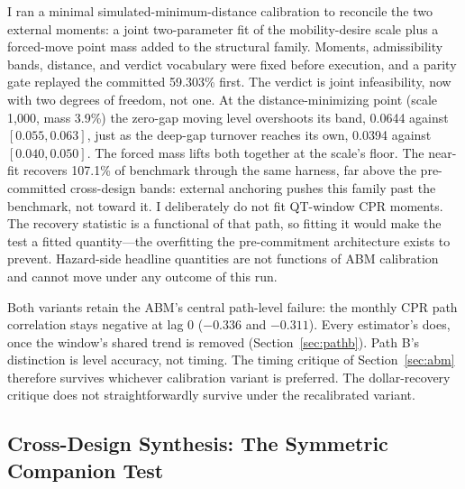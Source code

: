 \documentclass[12pt]{article}
\begin{document}
I ran a minimal simulated-minimum-distance calibration to reconcile the two external moments: a joint two-parameter fit of the mobility-desire scale plus a forced-move point mass added to the structural family. Moments, admissibility bands, distance, and verdict vocabulary were fixed before execution, and a parity gate replayed the committed 59.303\% first. The verdict is joint infeasibility, now with two degrees of freedom, not one. At the distance-minimizing point (scale 1{,}000, mass 3.9\%) the zero-gap moving level overshoots its band, 0.0644 against $[0.055, 0.063]$, just as the deep-gap turnover reaches its own, 0.0394 against $[0.040, 0.050]$. The forced mass lifts both together at the scale's floor. The near-fit recovers 107.1\% of benchmark through the same harness, far above the pre-committed cross-design bands: external anchoring pushes this family past the benchmark, not toward it. I deliberately do not fit QT-window CPR moments. The recovery statistic is a functional of that path, so fitting it would make the test a fitted quantity---the overfitting the pre-commitment architecture exists to prevent. Hazard-side headline quantities are not functions of ABM calibration and cannot move under any outcome of this run.

Both variants retain the ABM's central path-level failure: the monthly CPR path correlation stays negative at lag 0 ($-0.336$ and $-0.311$). Every estimator's does, once the window's shared trend is removed (Section~\ref{sec:pathb}). Path B's distinction is level accuracy, not timing. The timing critique of Section~\ref{sec:abm} therefore survives whichever calibration variant is preferred. The dollar-recovery critique does not straightforwardly survive under the recalibrated variant.

\subsection{Cross-Design Synthesis: The Symmetric Companion Test}\label{sec:robustness-synthesis}
\end{document}
